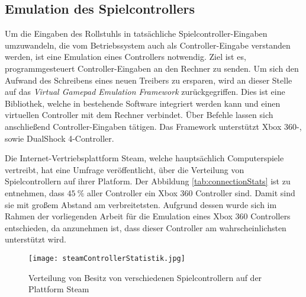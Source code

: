 \subsection{Emulation des Spielcontrollers}
Um die Eingaben des Rollstuhls in tatsächliche Spielcontroller-Eingaben umzuwandeln, die vom Betriebssystem auch als Controller-Eingabe verstanden werden, ist eine Emulation eines Controllers notwendig.
Ziel ist es, programmgesteuert Controller-Eingaben an den Rechner zu senden.
Um sich den Aufwand des Schreibens eines neuen Treibers zu ersparen, wird an dieser Stelle auf das \textit{Virtual Gamepad Emulation Framework}\cite{VirtualGamepadEmulation} zurückgegriffen.
Dies ist eine Bibliothek, welche in bestehende Software integriert werden kann und einen virtuellen Controller mit dem Rechner verbindet.
Über Befehle lassen sich anschließend Controller-Eingaben tätigen.
Das Framework unterstützt Xbox 360-, sowie DualShock 4-Controller\cite{VirtualGamepadEmulationa}.

Die Internet-Vertriebsplattform Steam, welche hauptsächlich Computerspiele vertreibt, hat eine Umfrage veröffentlicht, über die Verteilung von Spielcontrollern auf ihrer Platform.
Der Abbildung \ref{tab:connectionStats} ist zu entnehmen, dass $45\ \%$ aller Controller ein Xbox 360 Controller sind\cite{SteamSteamNews2018}.
Damit sind sie mit großem Abstand am verbreitetsten.
Aufgrund dessen wurde sich im Rahmen der vorliegenden Arbeit für die Emulation eines Xbox 360 Controllers entschieden, da anzunehmen ist, dass dieser Controller am wahrscheinlichsten unterstützt wird.

\begin{figure}[h]
    \centering
    \texttt{[image: steamControllerStatistik.jpg]}
    \caption{Verteilung von Besitz von verschiedenen Spielcontrollern auf der Plattform Steam\cite{SteamSteamNews2018}}
    \label{fig:controllerStats}
\end{figure}

